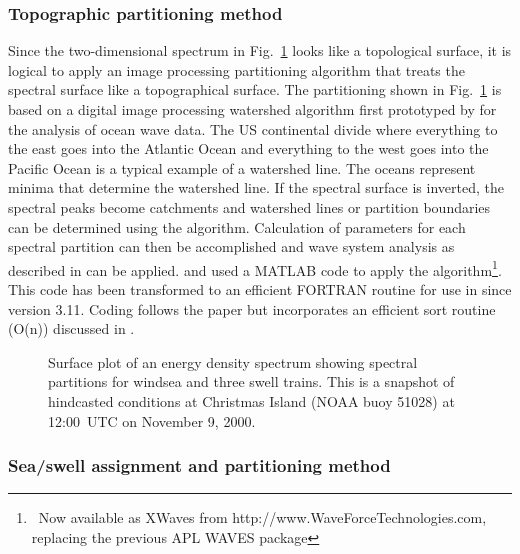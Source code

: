 \subsubsection{Topographic partitioning method}

Since the two-dimensional spectrum in Fig.~\ref{fig:partitions} looks like a
topological surface, it is logical to apply an image processing partitioning
algorithm that treats the spectral surface like a topographical surface.  The
partitioning shown in Fig.~\ref{fig:partitions} is based on a digital image
processing watershed algorithm \citep{art:VS91} first prototyped by
\cite{pro:HJ04} for the analysis of ocean wave data. 
The US continental divide where everything to the east goes into the Atlantic
Ocean and everything to the west goes into the Pacific Ocean is a typical
example of a watershed line.  The oceans represent minima that determine the
watershed line.  If the spectral surface is inverted, the spectral peaks
become catchments and watershed lines or partition boundaries can be
determined using the \cite{art:VS91} algorithm.  Calculation of parameters for
each spectral partition can then be accomplished and wave system analysis as
described in \cite{art:HP01} can be applied.  \cite{pro:HJ04} and
\cite{tol:Vict06b} used a MATLAB code to apply the \cite{art:VS91}
algorithm\footnote{~Now available as XWaves from
http://www.WaveForceTechnologies.com, replacing the previous APL WAVES
package}.  This code has been transformed to an efficient FORTRAN routine for
use in \ws since version 3.11.  Coding follows the
\cite{art:VS91} paper but incorporates an efficient sort routine (O(n))
discussed in \cite{rep:TTH06}.

\begin{figure} \begin{center}
\caption{Surface plot of an energy density spectrum showing spectral
         partitions for windsea and three swell trains.  This is a snapshot of
         hindcasted conditions at Christmas Island (NOAA buoy 51028) at
         12:00~UTC on November 9, 2000.}
         \label{fig:partitions} \botline
\end{center}
\end{figure}

\subsubsection{Sea/swell assignment and partitioning method}

